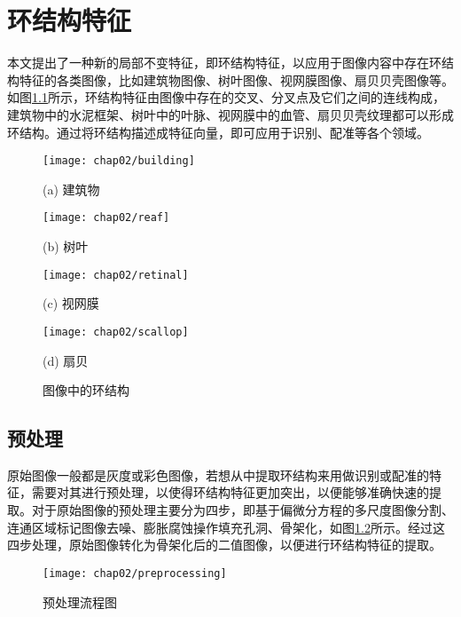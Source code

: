 

\chapter{环结构特征}
\label{cha:cycle}



本文提出了一种新的局部不变特征，即环结构特征，以应用于图像内容中存在环结构特征的各类图像，比如建筑物图像、树叶图像、视网膜图像、扇贝贝壳图像等。如图\ref{fig:Example}所示，环结构特征由图像中存在的交叉、分叉点及它们之间的连线构成，建筑物中的水泥框架、树叶中的叶脉、视网膜中的血管、扇贝贝壳纹理都可以形成环结构。通过将环结构描述成特征向量，即可应用于识别、配准等各个领域。

\begin{figure}[H]
\centering
  \begin{minipage}[b]{0.48\textwidth} 
      \centering 
      \texttt{[image: chap02/building]}
        \centerline{(a) 建筑物}\medskip
    \end{minipage}
  \begin{minipage}[b]{0.48\textwidth}
    \centering
    \texttt{[image: chap02/reaf]}
      \centerline{(b) 树叶}\medskip
  \end{minipage}
  \begin{minipage}[b]{0.48\textwidth}
    \centering
    \texttt{[image: chap02/retinal]}
      \centerline{(c) 视网膜}\medskip
  \end{minipage}
  \begin{minipage}[b]{0.48\textwidth}
    \centering
    \texttt{[image: chap02/scallop]}
      \centerline{(d) 扇贝}\medskip
  \end{minipage}
\caption{图像中的环结构}
\label{fig:Example}
\end{figure}




\section{预处理}
\label{}

原始图像一般都是灰度或彩色图像，若想从中提取环结构来用做识别或配准的特征，需要对其进行预处理，以使得环结构特征更加突出，以便能够准确快速的提取。对于原始图像的预处理主要分为四步，即基于偏微分方程的多尺度图像分割、连通区域标记图像去噪、膨胀腐蚀操作填充孔洞、骨架化，如图\ref{fig:chart-Preprocessing}所示。经过这四步处理，原始图像转化为骨架化后的二值图像，以便进行环结构特征的提取。
\begin{figure}[H]
\centering
    \centering
    \texttt{[image: chap02/preprocessing]}\medskip
\caption{预处理流程图}
\label{fig:chart-Preprocessing}
\end{figure}
